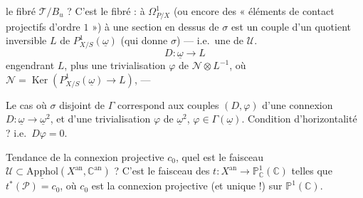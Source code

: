 \documentclass[11pt,a4paper]{article}
\begin{document}
le fibré $\mathcal{T}/B_u$  ? C'est le fibré \struck{\ill{}}  : à $\Omega^1_{P/X}$ (ou encore des « éléments de contact projectifs d'ordre $1$ »)  à une section en dessus de $\sigma$ est   un couple d'un quotient inversible $L$ de $P^1_{X/S}(\underline{\omega})$ (qui donne $\sigma$) — i.e.\ une \struck{\ill{}} \add{\ill{}} de $\mathcal{U}$.
\[
D:\underline{\omega}\to L
\]
\struck{\ill{}}  engendrant $L$, plus
une trivialisation $\varphi$ de $\mathcal{N}\otimes L^{-1}$, où $\mathcal{N}=\operatorname{Ker}(P^1_{X/S}(\underline{\omega})\to L)$,  — 

Le cas où $\sigma$ disjoint de $\Gamma$  correspond aux couples $(D,\varphi)$ d'une connexion  $D:\underline{\omega}\to\underline{\omega}^2$, et d'une trivialisation $\varphi$ de $\underline{\omega}^2$, $\varphi\in\Gamma(\underline{\omega})$.  Condition d'horizontalité ?    \struck{\ill{}} i.e.\ $D\varphi=0$.

Tendance de la connexion projective $c_0$, quel est le faisceau $\mathcal{U}\subset\underline{\mathrm{Apphol}}(X^{\mathrm{an}},\mathbb{C}^{\mathrm{an}})$ ? C'est le faisceau des  \struck{\ill{}}   $t:X^{\mathrm{an}}\to\mathbb{P}^1_{\mathbb{C}}(\mathbb{C})$ telles que $t^*(\mathcal{P})=c_0$, où $c_0$ est la connexion projective (et unique !) sur $\mathbb{P}^1(\mathbb{C})$.
\end{document}
